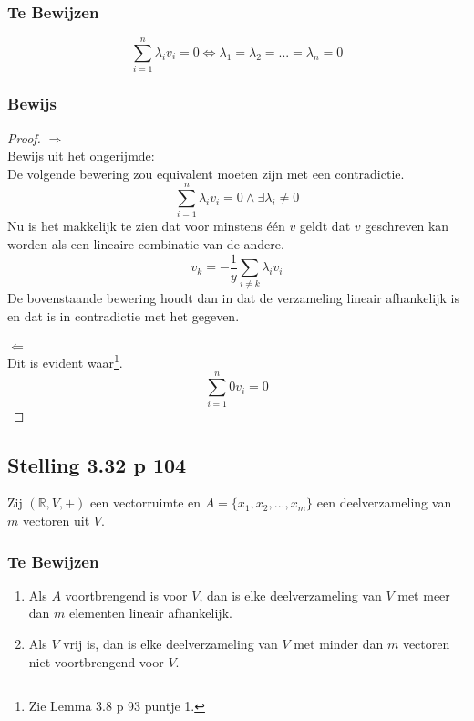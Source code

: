 \documentclass[lineaire_algebra_oplossingen.tex]{subfiles}
\begin{document}
\subsubsection*{Te Bewijzen}
\[
\sum_{i=1}^n\lambda_iv_i=0 \Leftrightarrow \lambda_1 = \lambda_2 = ... = \lambda_n = 0
\]

\subsubsection*{Bewijs}
\begin{proof}
\emph{$\Rightarrow$}\\
Bewijs uit het ongerijmde:\\
De volgende bewering zou equivalent moeten zijn met een contradictie.
\[
\sum_{i=1}^n\lambda_iv_i=0 \wedge \exists \lambda_i \neq 0
\]
Nu is het makkelijk te zien dat voor minstens \'e\'en $v$ geldt dat $v$ geschreven kan worden als een lineaire combinatie van de andere.
\[
v_k = -\frac{1}{y}\sum_{i\neq k}\lambda_iv_i
\]
De bovenstaande bewering houdt dan in dat de verzameling lineair afhankelijk is en dat is in contradictie met het gegeven.
\\\\
\emph{$\Leftarrow$}\\
Dit is evident waar\footnote{Zie Lemma 3.8 p 93 puntje 1.}.
\[
\sum_{i=1}^n0v_i=0
\]
\end{proof}


\subsection{Stelling 3.32 p 104}
\label{3.32}
Zij $(\mathbb{R},V,+)$ een vectorruimte en $A = \{x_1,x_2,...,x_m\}$ een deelverzameling van $m$ vectoren uit $V$.

\subsubsection*{Te Bewijzen}
\begin{enumerate}
\item
Als $A$ voortbrengend is voor $V$, dan is elke deelverzameling van $V$ met meer dan $m$ elementen lineair afhankelijk.
\item
Als $V$ vrij is, dan is elke deelverzameling van $V$ met minder dan $m$ vectoren niet voortbrengend voor $V$.
\end{enumerate}
\end{document}
